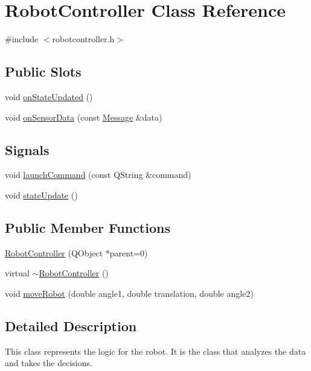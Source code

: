 \hypertarget{classRobotController}{
\section{RobotController Class Reference}
\label{classRobotController}
}


{\ttfamily \#include $<$robotcontroller.h$>$}

\subsection*{Public Slots}
\begin{DoxyCompactItemize}
\item 
void \hyperlink{classRobotController_af7a4ba9ea79c8905b428b2bf1b7e2c5b}{onStateUpdated} ()
\item 
void \hyperlink{classRobotController_a9493a7011af6b4b31413ed42fe3fc518}{onSensorData} (const \hyperlink{classMessage}{Message} \&data)
\end{DoxyCompactItemize}
\subsection*{Signals}
\begin{DoxyCompactItemize}
\item 
void \hyperlink{classRobotController_a4c89049efc91e8d172dc9ca6a78f50fd}{launchCommand} (const QString \&command)
\item 
void \hyperlink{classRobotController_acf08e56717b3134fee7e36f481746e8f}{stateUpdate} ()
\end{DoxyCompactItemize}
\subsection*{Public Member Functions}
\begin{DoxyCompactItemize}
\item 
\hyperlink{classRobotController_af0d6c5568c619b1931792d1fd30bf755}{RobotController} (QObject $\ast$parent=0)
\item 
virtual \hyperlink{classRobotController_a4441cd6adf323a0ce3c454dc4f02efaf}{$\sim$RobotController} ()
\item 
void \hyperlink{classRobotController_a2b6ec73f9327db8a85b0acbeb085c9cc}{moveRobot} (double angle1, double translation, double angle2)
\end{DoxyCompactItemize}


\subsection{Detailed Description}
This class represents the logic for the robot. It is the class that analyzes the data and takes the decisions. 

